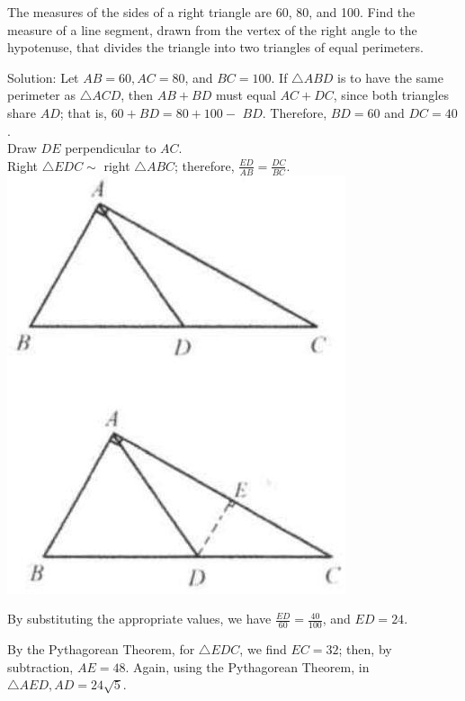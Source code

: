 \documentclass{article}
\begin{document}
The measures of the sides of a right triangle are 60, 80, and 100. Find the measure of a line segment, drawn from the vertex of the right angle to the hypotenuse, that divides the triangle into two triangles of equal perimeters.

Solution:
Let \(A B=60, A C=80\), and \(B C=100\). If \(\triangle A B D\) is to have the same perimeter as \(\triangle A C D\), then \(A B+B D\) must equal \(A C+D C\), since both triangles share \(A D\); that is, \(60+B D=80+100-\) \(B D\). Therefore, \(B D=60\) and \(D C=40\).\\
Draw \(D E\) perpendicular to \(A C\).\\
Right \(\triangle E D C \sim\) right \(\triangle A B C\); therefore, \(\frac{E D}{A B}=\frac{D C}{B C}\).\\
\centering
\includegraphics[width=\textwidth]{images/083(2).jpg}


By substituting the appropriate values, we have \(\frac{E D}{60}=\frac{40}{100}\), and \(E D=24\).

By the Pythagorean Theorem, for \(\triangle E D C\), we find \(E C=32\); then, by subtraction, \(A E=48\). Again, using the Pythagorean Theorem, in \(\triangle A E D, A D=24 \sqrt{5}\).
\end{document}
